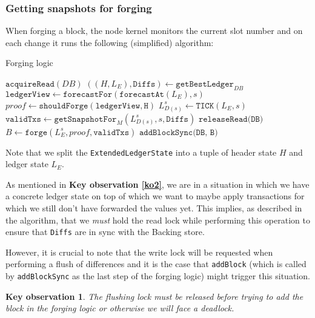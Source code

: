 \documentclass[11pt,a4paper]{article}
\theoremstyle{definition}
\newtheorem{observation}{Key observation}
\begin{document}
\subsubsection{Getting snapshots for forging}

When forging a block, the node kernel monitors the current slot number and on
each change it runs the following (simplified) algorithm:

\begin{algorithm}
  \caption{Forging logic}
  \begin{algorithmic}[1]
    \State $\texttt{acquireRead}(DB)$
    \State $((H, L_{E}), \texttt{Diffs}) \gets \texttt{getBestLedger}_{DB}$
    \State $\texttt{ledgerView} \gets \texttt{forecastFor}(\texttt{forecastAt}(L_{E}), s)$
    \State $proof \gets \texttt{shouldForge}(\texttt{ledgerView}, \texttt{H})$
      \State \Return
      \EndIf
    \State $L^{s}_{D(s)} \gets \texttt{TICK}(L_{E}, s)$
    \State $\texttt{validTxs} \gets \texttt{getSnapshotFor}_{M}(L^{s}_{D(s)}, s, \texttt{Diffs})$
    \State $\texttt{releaseRead(DB)}$
    \State $B \gets \texttt{forge}(L^{s}_{E}, proof, \texttt{validTxs})$
    \State $\texttt{addBlockSync(DB, B)}$
    \EndProcedure
 \end{algorithmic}
\end{algorithm}

Note that we split the \texttt{ExtendedLedgerState} into a tuple of header state
$H$ and ledger state $L_{E}$.

As mentioned in \textbf{Key observation \ref{ko2}}, we are in a situation in
which we have a concrete ledger state on top of which we want to maybe apply
transactions for which we still don't have forwarded the values yet. This
implies, as described in the algorithm, that we \emph{must} hold the read lock
while performing this operation to ensure that \texttt{Diffs} are in sync with
the Backing store.

However, it is crucial to note that the write lock will be requested when
performing a flush of differences and it is the case that \texttt{addBlock}
(which is called by \texttt{addBlockSync} as the last step of the forging logic)
might trigger this situation.

\begin{observation}
  \emph{The flushing lock must be released before trying to add the block in the
    forging logic or otherwise we will face a deadlock.}
\end{observation}
\end{document}
